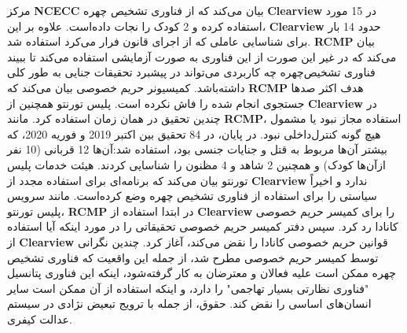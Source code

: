 مرکز \textenglish{\textbf{NCECC}} بیان می‌کند که از فناوری تشخیص چهره \textenglish{\textbf{Clearview}} در 15 مورد استفاده کرده و 2 کودک را نجات داده‌است.
علاوه بر این، \textenglish{\textbf{Clearview}} حدود 14 بار برای شناسایی عاملی که از اجرای قانون فرار می‌کرد استفاده شد.
\textenglish{\textbf{RCMP}} بیان می‌کند که در غیر این صورت از این فناوری به صورت آزمایشی استفاده می‌کند تا ببیند فناوری تشخیص‌چهره چه کاربردی می‌تواند در پیشبرد تحقیقات جنایی به طور کلی داشته‌باشد.
کمیسیونر حریم خصوصی بیان می‌کند که \textenglish{\textbf{RCMP}} هدف اکثر صدها جستجوی انجام شده را فاش نکرده است.
پلیس تورنتو همچنین از \textenglish{\textbf{Clearview}} در چندین تحقیق در همان زمان استفاده کرد.
مانند \textenglish{\textbf{RCMP}}، استفاده مجاز نبود یا مشمول هیچ گونه کنترل‌داخلی نبود.
در پایان، در 84 تحقیق بین اکتبر 2019 و فوریه 2020، که بیشتر آن‌ها مربوط به قتل و جنایات جنسی بود، استفاده شد:آن‌ها 12 قربانی (10 نفر ازآن‌ها کودک) و همچنین 2 شاهد و 4 مظنون را شناسایی کردند.
هیئت خدمات پلیس تورنتو بیان می‌کند که برنامه‌ای برای استفاده مجدد از \textenglish{\textbf{Clearview}} ندارد و اخیراً سیاستی را برای استفاده از فناوری تشخیص چهره وضع کرده‌است.
مانند سرویس پلیس تورنتو، \textenglish{\textbf{RCMP}} در ابتدا استفاده از \textenglish{\textbf{Clearview}} را برای کمیسر حریم خصوصی کانادا رد کرد.
سپس دفتر کمیسر حریم خصوصی تحقیقاتی را در مورد اینکه آیا استفاده از \textenglish{\textbf{Clearview}} قوانین حریم خصوصی کانادا را نقض می‌کند، آغاز کرد.
چندین نگرانی توسط کمیسر حریم خصوصی مطرح شد، از جمله این واقعیت که فناوری تشخیص چهره ممکن است علیه فعالان و معترضان به کار گرفته‌شود، اینکه این فناوری پتانسیل "فناوری نظارتی بسیار تهاجمی" را دارد، و اینکه استفاده از آن ممکن است سایر انسان‌های اساسی را نقض کند.
حقوق، از جمله با ترویج تبعیض نژادی در سیستم عدالت کیفری.
\newpage


